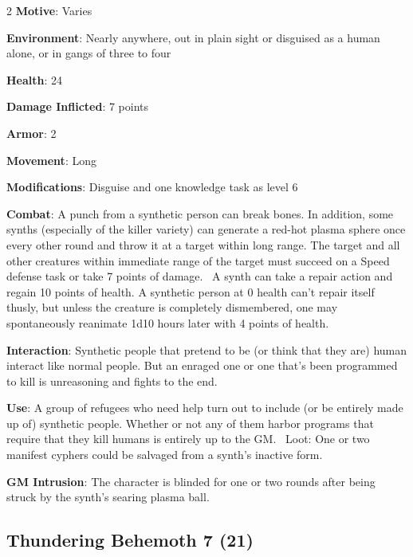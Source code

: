 \begin{multicols}{2}
\textbf{Motive}: Varies 

\textbf{Environment}: Nearly anywhere, out in plain sight or disguised as a human alone, or in gangs of three to four 

\textbf{Health}: 24 

\textbf{Damage Inflicted}: 7 points 

\textbf{Armor}: 2 

\textbf{Movement}: Long 

\textbf{Modifications}: Disguise and one knowledge task as level 6 

\textbf{Combat}: A punch from a synthetic person can break bones. In addition, some synths (especially of the killer variety) can generate a red-hot plasma sphere once every other round and throw it at a target within long range. The target and all other creatures within immediate range of the target must succeed on a Speed defense task or take 7 points of damage. 
A synth can take a repair action and regain 10 points of health. A synthetic person at 0 health can’t repair itself thusly, but unless the creature is completely dismembered, one may spontaneously reanimate 1d10 hours later with 4 points of health. 

\textbf{Interaction}: Synthetic people that pretend to be (or think that they are) human interact like normal people. But an enraged one or one that’s been programmed to kill is unreasoning and fights to the end. 

\textbf{Use}: A group of refugees who need help turn out to include (or be entirely made up of) synthetic people. Whether or not any of them harbor programs that require that they kill humans is entirely up to the GM. 
Loot: One or two manifest cyphers could be salvaged from a synth’s inactive form.

\textbf{GM Intrusion}: The character is blinded for one or two rounds after being struck by the synth’s searing plasma ball.

\subsection{Thundering Behemoth 7 (21)}\
\index[AllCre]{Creatures by name!Thundering Behemoth}


\end{multicols}
